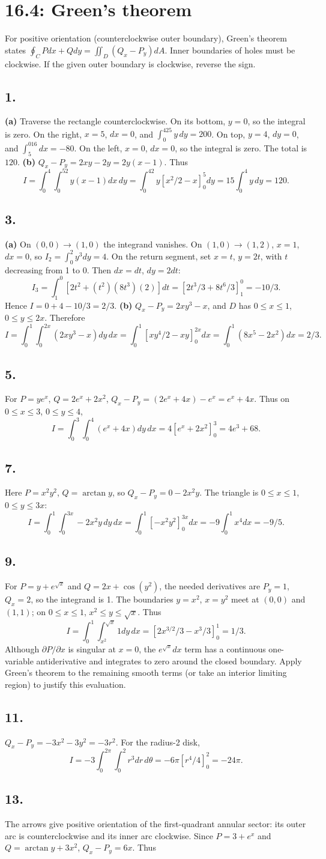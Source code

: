 \documentclass[11pt]{article}
\newcommand{\ex}[1]{\subsection*{#1.}}
\newcommand{\ans}[1]{\boxed{#1}}
\begin{document}
\clearpage\section*{16.4: Green's theorem}
For positive orientation (counterclockwise outer boundary), Green's theorem states $\oint_C Pdx+Qdy=\iint_D(Q_x-P_y)dA$. Inner boundaries of holes must be clockwise. If the given outer boundary is clockwise, reverse the sign.
\ex{1}
\textbf{(a)} Traverse the rectangle counterclockwise. On its bottom, $y=0$, so the integral is zero. On the right, $x=5$, $dx=0$, and $\int_0^425y\,dy=200$. On top, $y=4$, $dy=0$, and $\int_5^016dx=-80$. On the left, $x=0$, $dx=0$, so the integral is zero. The total is $\ans{120}$.
\textbf{(b)} $Q_x-P_y=2xy-2y=2y(x-1)$. Thus
\[I=\int_0^4\int_0^52y(x-1)dx\,dy
=\int_0^42y[x^2/2-x]_0^5dy=15\int_0^4y\,dy=\ans{120}.\]
\ex{3}
\textbf{(a)} On $(0,0)\to(1,0)$ the integrand vanishes. On $(1,0)\to(1,2)$, $x=1$, $dx=0$, so $I_2=\int_0^2y^3dy=4$. On the return segment, set $x=t$, $y=2t$, with $t$ decreasing from 1 to 0. Then $dx=dt$, $dy=2dt$:
\[I_3=\int_1^0[2t^2+(t^2)(8t^3)(2)]dt
=[2t^3/3+8t^6/3]_1^0=-10/3.\]
Hence $I=0+4-10/3=\ans{2/3}$.
\textbf{(b)} $Q_x-P_y=2xy^3-x$, and $D$ has $0\le x\le1$, $0\le y\le2x$. Therefore
\[I=\int_0^1\int_0^{2x}(2xy^3-x)dy\,dx
=\int_0^1[xy^4/2-xy]_0^{2x}dx
=\int_0^1(8x^5-2x^2)dx=\ans{2/3}.\]
\ex{5}
For $P=ye^x$, $Q=2e^x+2x^2$, $Q_x-P_y=(2e^x+4x)-e^x=e^x+4x$. Thus on $0\le x\le3$, $0\le y\le4$,
\[I=\int_0^3\int_0^4(e^x+4x)dy\,dx
=4[e^x+2x^2]_0^3=\ans{4e^3+68}.\]
\ex{7}
Here $P=x^2y^2$, $Q=\arctan y$, so $Q_x-P_y=0-2x^2y$. The triangle is $0\le x\le1$, $0\le y\le3x$:
\[I=\int_0^1\int_0^{3x}-2x^2y\,dy\,dx
=\int_0^1[-x^2y^2]_0^{3x}dx=-9\int_0^1x^4dx=\ans{-9/5}.\]
\ex{9}
For $P=y+e^{\sqrt x}$ and $Q=2x+\cos(y^2)$, the needed derivatives are $P_y=1$, $Q_x=2$, so the integrand is 1. The boundaries $y=x^2$, $x=y^2$ meet at $(0,0)$ and $(1,1)$; on $0\le x\le1$, $x^2\le y\le\sqrt x$. Thus
\[I=\int_0^1\int_{x^2}^{\sqrt x}1dy\,dx
=[2x^{3/2}/3-x^3/3]_0^1=\ans{1/3}.\]
Although $\partial P/\partial x$ is singular at $x=0$, the $e^{\sqrt x}dx$ term has a continuous one-variable antiderivative and integrates to zero around the closed boundary. Apply Green's theorem to the remaining smooth terms (or take an interior limiting region) to justify this evaluation.
\ex{11}
$Q_x-P_y=-3x^2-3y^2=-3r^2$. For the radius-2 disk,
\[I=-3\int_0^{2\pi}\int_0^2r^3dr\,d\theta
=-6\pi[r^4/4]_0^2=\ans{-24\pi}.\]
\ex{13}
The arrows give positive orientation of the first-quadrant annular sector: its outer arc is counterclockwise and its inner arc clockwise. Since $P=3+e^x$ and $Q=\arctan y+3x^2$, $Q_x-P_y=6x$. Thus
\end{document}
